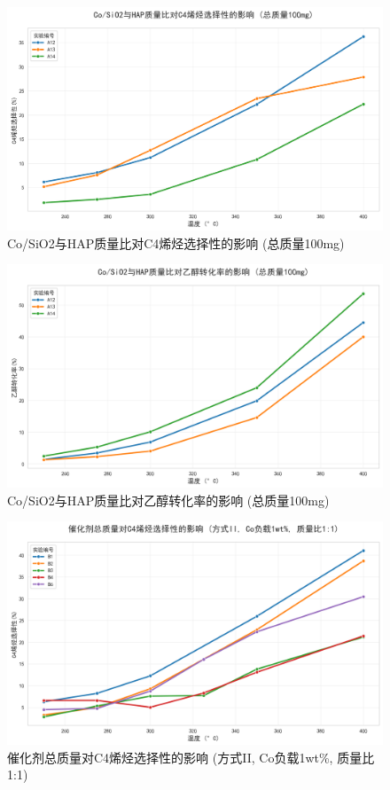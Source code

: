 \begin{figure}[h]%
	\centering%
	\includegraphics [scale=0.6]{图/2-5-1-1.png}
	\caption{Co/SiO2与HAP质量比对C4烯烃选择性的影响 (总质量100mg)} 
	\label{fig:1}
\end{figure}

\begin{figure}[h]%
	\centering%
	\includegraphics [scale=0.6]{图/2-5-1-2.png}
	\caption{Co/SiO2与HAP质量比对乙醇转化率的影响 (总质量100mg)} 
	\label{fig:1}
\end{figure}

\begin{figure}[h]%
	\centering%
	\includegraphics [scale=0.6]{图/2-6-1-1.png}
	\caption{催化剂总质量对C4烯烃选择性的影响 (方式II, Co负载1wt\%, 质量比1:1)} 
	\label{fig:1}
\end{figure}

